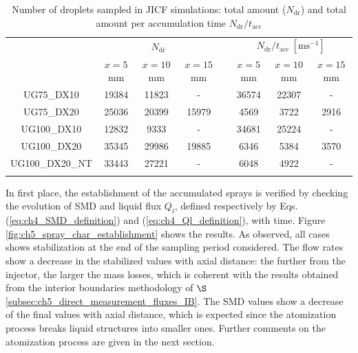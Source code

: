 \begin{table}[!h]
\centering
\caption{Number of droplets sampled in JICF simulations: total amount ($N_\mathrm{dr}$) and total amount per accumulation time $N_\mathrm{dr}/t_\mathrm{acc}$}
\begin{tabular}{cccccccc}
\thickhline
\multirow{2}{*}{ \textbf{Case}}  & \multicolumn{3}{c}{$N_\mathrm{dr}$} & & \multicolumn{3}{c}{$N_\mathrm{dr}/t_\mathrm{acc}~[\mathrm{ms}^{-1}]$} \\
\cline{2-4} \cline{6-8}
& $x = 5$ mm & $x = 10$ mm & $x = 15$ mm &  & $x = 5$ mm & $x = 10$ mm & $x = 15$ mm  \\
\thickhline 
UG75\_DX10  & 19384 & 11823 & -  & & 36574 & 22307 & - \\
UG75\_DX20  & 25036 & 20399 & 15979  & & 4569 & 3722 & 2916 \\
UG100\_DX10 & 12832 & 9333 & -  & & 34681 & 25224 & - \\
UG100\_DX20 & 35345 & 29986 & 19885  & & 6346 & 5384 & 3570 \\
UG100\_DX20\_NT & 33443 & 27221 & -  & & 6048 & 4922 & - \\
\thickhline
\end{tabular}
\label{tab:jicf_SLI_Ndr_accumulated}
\end{table}








In first place, the establishment of the accumulated sprays is verified by checking the evolution of SMD and liquid flux $Q_l$, defined respectively by Eqs. (\ref{eq:ch4_SMD_definition}) and (\ref{eq:ch4_Ql_definition}), with time. Figure \ref{fig:ch5_spray_char_establishment} shows the results. As observed, all cases shows stabilization at the end of the sampling period considered. The flow rates show a decrease in the stabilized values with axial distance: the further from the injector, the larger the mass losses, which is coherent with the results obtained from the interior boundaries methodology of $\S$\ref{subsec:ch5_direct_measurement_fluxes_IB}. The SMD values show a decrease of the final values with axial distance, which is expected since the atomization process breaks liquid structures into smaller ones. Further comments on the atomization process are given in the next section. %

